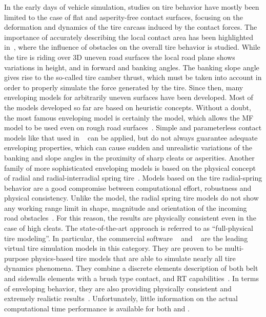In the early days of vehicle simulation, studies on tire behavior have mostly been limited to the case of flat and asperity-free contact surfaces, focusing on the deformation and dynamics of the tire carcass induced by the contact forces. The importance of accurately describing the local contact area has been highlighted in~\cite{kageyama2002study, pacejka2005spin}, where the influence of obstacles on the overall tire behavior is studied. While the tire is riding over 3D uneven road surfaces the local road plane shows variations in height, and in forward and banking angles. The banking slope angle gives rise to the so-called tire camber thrust, which must be taken into account in order to properly simulate the force generated by the tire. Since then, many enveloping models for arbitrarily uneven surfaces have been developed. Most of the models developed so far are based on heuristic concepts. Without a doubt, the most famous enveloping model is certainly the \Swift{} model, which allows the \ac{MF} model to be used even on rough road surfaces~\cite{schmeitz2004semiempirical}. Simple and parameterless contact models like that used in \TMEasy{}~\cite{rill2013tmeasy, rill2018sophisticated} can be applied, but do not always guarantee adequate enveloping properties,  which can cause sudden and unrealistic variations of the banking and slope angles in the proximity of sharp cleats or asperities. Another family of more sophisticated enveloping models is based on the physical concept of radial and radial-interradial spring tire~\cite{davis1975radial, badalamenti1988radial, negrut1994dynamic}. Models based on the tire radial-spring behavior are a good compromise between computational effort, robustness and physical consistency. Unlike the \Swift{} model, the radial spring tire models do not show any working range limit in shape, magnitude and orientation of the incoming road obstacles~\cite{davis1975radial}. For this reason, the results are physically consistent even in the case of high cleats. The state-of-the-art approach is referred to as ``full-physical tire modeling''. In particular, the commercial software \FTire{}~\cite{gipser2005ftire} and \CDTire{}~\cite{gallrein2007cdtire, gallrein2014advanced} are the leading virtual tire simulation models in this category. They are proven to be multi-purpose physics-based tire models that are able to simulate nearly all tire dynamics phenomena. They combine a discrete elements description of both belt and sidewalls elements with a brush type contact, and \ac{RT} capabilities~\cite{gipser2021ftire}. In terms of enveloping behavior, they are also providing physically consistent and extremely realistic results~\cite{gipser2008ftire, gallrein2007cdtire}. Unfortunately, little information on the actual computational time performance is available for both \FTire{} and \CDTire{}.

